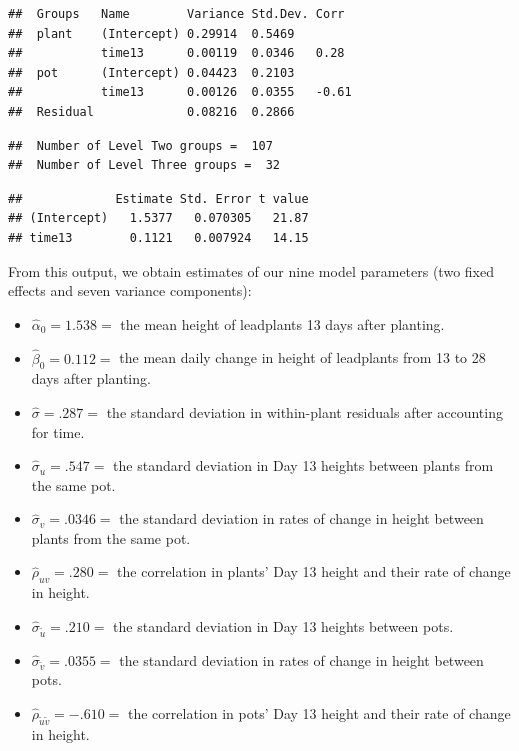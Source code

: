 \documentclass[
]{krantz}
\providecommand{\tightlist}{%
  \setlength{\itemsep}{0pt}\setlength{\parskip}{0pt}}
\begin{document}
\begin{verbatim}
##  Groups   Name        Variance Std.Dev. Corr 
##  plant    (Intercept) 0.29914  0.5469        
##           time13      0.00119  0.0346   0.28 
##  pot      (Intercept) 0.04423  0.2103        
##           time13      0.00126  0.0355   -0.61
##  Residual             0.08216  0.2866
\end{verbatim}

\begin{verbatim}
##  Number of Level Two groups =  107 
##  Number of Level Three groups =  32
\end{verbatim}

\begin{verbatim}
##             Estimate Std. Error t value
## (Intercept)   1.5377   0.070305   21.87
## time13        0.1121   0.007924   14.15
\end{verbatim}

From this output, we obtain estimates of our nine model parameters (two fixed effects and seven variance components):

\begin{itemize}
\tightlist
\item
  \(\hat{\alpha}_{0}=1.538=\) the mean height of leadplants 13 days after planting.
\item
  \(\hat{\beta}_{0}=0.112=\) the mean daily change in height of leadplants from 13 to 28 days after planting.
\item
  \(\hat{\sigma}=.287=\) the standard deviation in within-plant residuals after accounting for time.
\item
  \(\hat{\sigma}_{u}=.547=\) the standard deviation in Day 13 heights between plants from the same pot.
\item
  \(\hat{\sigma}_{v}=.0346=\) the standard deviation in rates of change in height between plants from the same pot.
\item
  \(\hat{\rho}_{uv}=.280=\) the correlation in plants' Day 13 height and their rate of change in height.
\item
  \(\hat{\sigma}_{\tilde{u}}=.210=\) the standard deviation in Day 13 heights between pots.
\item
  \(\hat{\sigma}_{\tilde{v}}=.0355=\) the standard deviation in rates of change in height between pots.
\item
  \(\hat{\rho}_{\tilde{u}\tilde{v}}=-.610=\) the correlation in pots' Day 13 height and their rate of change in height.
\end{itemize}
\end{document}

